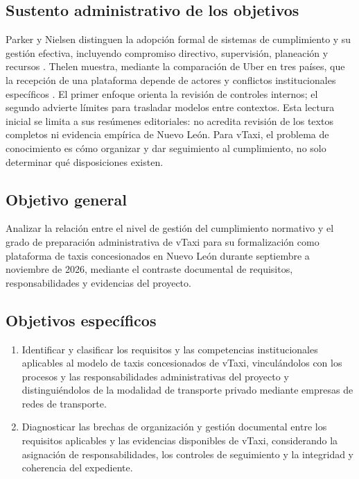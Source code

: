 {\subsection{Sustento administrativo de los objetivos}
Parker y Nielsen distinguen la adopción formal de sistemas de cumplimiento y su gestión efectiva, incluyendo compromiso directivo, supervisión, planeación y recursos \parencite{parkerNielsen2009}. Thelen muestra, mediante la comparación de Uber en tres países, que la recepción de una plataforma depende de actores y conflictos institucionales específicos \parencite{thelen2018}. El primer enfoque orienta la revisión de controles internos; el segundo advierte límites para trasladar modelos entre contextos. Esta lectura inicial se limita a sus resúmenes editoriales: no acredita revisión de los textos completos ni evidencia empírica de Nuevo León. Para vTaxi, el problema de conocimiento es cómo organizar y dar seguimiento al cumplimiento, no solo determinar qué disposiciones existen.

\subsection{Objetivo general}

Analizar la relación entre el nivel de gestión del cumplimiento normativo y el grado de preparación administrativa de vTaxi para su formalización como plataforma de taxis concesionados en Nuevo León durante septiembre a noviembre de 2026, mediante el contraste documental de requisitos, responsabilidades y evidencias del proyecto.

\subsection{Objetivos específicos}

\begin{enumerate}

\item Identificar y clasificar los requisitos y las competencias institucionales aplicables al modelo de taxis concesionados de vTaxi, vinculándolos con los procesos y las responsabilidades administrativas del proyecto y distinguiéndolos de la modalidad de transporte privado mediante empresas de redes de transporte.

\item Diagnosticar las brechas de organización y gestión documental entre los requisitos aplicables y las evidencias disponibles de vTaxi, considerando la asignación de responsabilidades, los controles de seguimiento y la integridad y coherencia del expediente.


\end{enumerate}}
